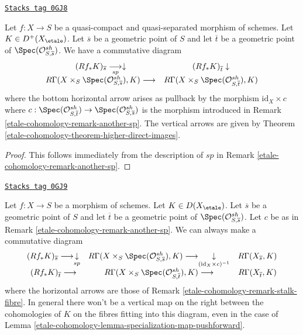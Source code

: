 \begin{lemma}
\label{etale-cohomology-lemma-specialization-map-pushforward}
\href{https://stacks.math.columbia.edu/tag/0GJ8}{\texttt{Stacks tag 0GJ8}}

Let $f : X \to S$ be a quasi-compact and quasi-separated morphism of schemes.
Let $K \in D^+(X_\etale)$. Let $\overline{s}$ be a geometric point of $S$
and let $\overline{t}$ be a geometric point of
$\Spec(\mathcal{O}^{sh}_{S, \overline{s}})$. We have a commutative
diagram
$$
\begin{array}{cc}(Rf_*K)_{\overline{s}} \underset{sp}{\longrightarrow}\downarrow & (Rf_*K)_{\overline{t}} \downarrow \\ R\Gamma(X \times_S \Spec(\mathcal{O}^{sh}_{S, \overline{s}}), K)
\longrightarrow & R\Gamma(X \times_S \Spec(\mathcal{O}^{sh}_{S, \overline{t}}), K)\end{array}
$$
where the bottom horizontal arrow arises as pullback by the morphism
$\text{id}_X \times c$ where
$c : \Spec(\mathcal{O}^{sh}_{S, \overline{t}}) \to
\Spec(\mathcal{O}^{sh}_{S, \overline{s}})$
is the morphism introduced in Remark \ref{etale-cohomology-remark-another-sp}.
The vertical arrows are given by
Theorem \ref{etale-cohomology-theorem-higher-direct-images}.
\end{lemma}

\begin{proof}
This follows immediately from the description
of $sp$ in Remark \ref{etale-cohomology-remark-another-sp}.
\end{proof}

\begin{remark}
\label{etale-cohomology-remark-specialization-map-and-fibres}
\href{https://stacks.math.columbia.edu/tag/0GJ9}{\texttt{Stacks tag 0GJ9}}

Let $f : X \to S$ be a morphism of schemes. Let $K \in D(X_\etale)$.
Let $\overline{s}$ be a geometric point of $S$ and let $\overline{t}$
be a geometric point of $\Spec(\mathcal{O}^{sh}_{S, \overline{s}})$.
Let $c$ be as in Remark \ref{etale-cohomology-remark-another-sp}.
We can always make a commutative diagram
$$
\begin{array}{ccc}(Rf_*K)_{\overline{s}} \longrightarrow\underset{sp}{\downarrow} & R\Gamma(X \times_S \Spec(\mathcal{O}_{S, \overline{s}}^{sh}), K)
\longrightarrow\underset{(\text{id}_X \times c)^{-1}}{\downarrow} & R\Gamma(X_{\overline{s}}, K) \\ (Rf_*K)_{\overline{t}} \longrightarrow & R\Gamma(X \times_S \Spec(\mathcal{O}_{S, \overline{t}}^{sh}), K) \longrightarrow & R\Gamma(X_{\overline{t}}, K)\end{array}
$$
where the horizontal arrows are those of Remark \ref{etale-cohomology-remark-stalk-fibre}.
In general there won't be a vertical map on the right
between the cohomologies of $K$ on the fibres fitting into this
diagram, even in the case of Lemma \ref{etale-cohomology-lemma-specialization-map-pushforward}.
\end{remark}

